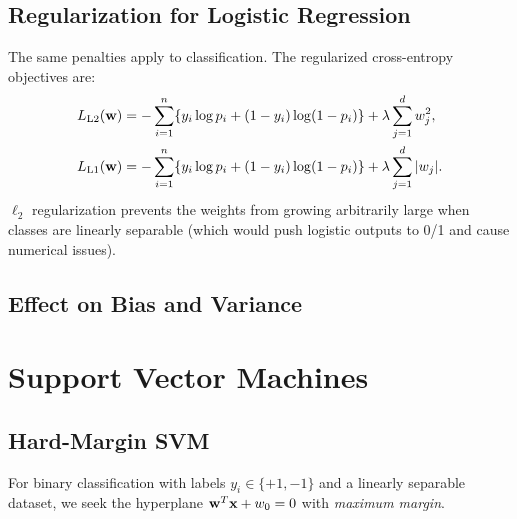 \documentclass[oneside]{book}
\begin{document}
\section{Regularization for Logistic Regression}

The same penalties apply to classification. The regularized cross-entropy objectives are:
\begin{align*}
L_{\mathrm{L2}}(\mathbf{w}) &= -\sum_{i=1}^n \{y_i \log p_i + (1-y_i)\log(1-p_i)\} + \lambda\sum_{j=1}^d w_j^2, \\
L_{\mathrm{L1}}(\mathbf{w}) &= -\sum_{i=1}^n \{y_i \log p_i + (1-y_i)\log(1-p_i)\} + \lambda\sum_{j=1}^d |w_j|.
\end{align*}
$\ell_2$ regularization prevents the weights from growing arbitrarily large when classes are linearly separable (which would push logistic outputs to 0/1 and cause numerical issues).

\section{Effect on Bias and Variance}


\chapter{Support Vector Machines}

\section{Hard-Margin SVM}

For binary classification with labels $y_i \in \{+1, -1\}$ and a linearly separable dataset, we seek the hyperplane $\mathbf{w}^T\mathbf{x} + w_0 = 0$ with \emph{maximum margin}.

\end{document}
